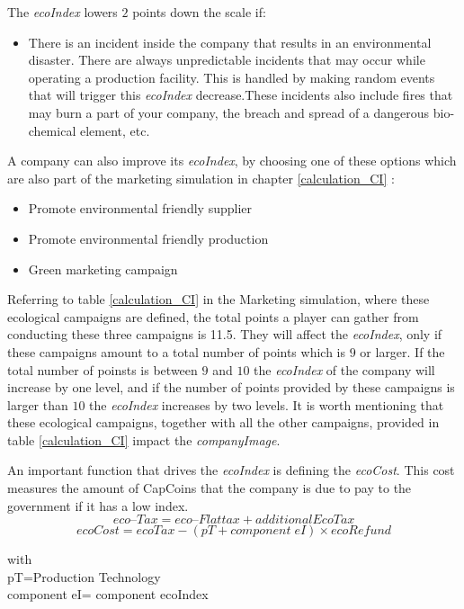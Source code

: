 The \textit{ecoIndex} lowers $2$ points down the scale if: 
\begin{itemize}
	\item There is an incident inside the company that results in an environmental disaster. There are always unpredictable incidents that may occur while operating a production facility. This is handled by making random events that will trigger this \textit{ecoIndex} decrease.These incidents also include fires that may burn a part of your company, the breach and spread of a dangerous bio-chemical element, etc.
\end{itemize}

A company can also improve its \textit{ecoIndex}, by choosing one of these options which are also part of the marketing simulation in chapter \ref{calculation_CI} : 

\begin{itemize}
\item Promote environmental friendly supplier
\item Promote environmental friendly production
\item Green marketing campaign
\end{itemize}
Referring to table \ref{calculation_CI} in the Marketing simulation, where these ecological campaigns are defined, the total points a player can gather from conducting these three campaigns is 11.5. They will affect the \textit{ecoIndex}, only if these campaigns amount to a total number of points which is $9$ or larger. If the total number of poinsts is between $9$ and $10$ the \textit{ecoIndex} of the company will increase by one level, and if the number of points provided by these campaigns is larger than $10$ the \textit{ecoIndex} increases by two levels. It is worth mentioning that these ecological campaigns, together with all the other campaigns, provided in table \ref{calculation_CI} impact the \textit{companyImage}.

An important function that drives the \textit{ecoIndex} is defining the \textit{ecoCost}. This cost measures the amount of CapCoins that the company is due to pay to the government if it has a low index. \\ 
\begin{equation}
eco–Tax= eco–Flat tax+ additionalEcoTax
\label{eq:eco-tax}
\end{equation}
\begin{equation}
ecoCost= ecoTax - (pT + component \; eI)\times ecoRefund 
\label{eq:eco-cost}
\end{equation}
\begin{center}
with\\
	pT=Production Technology\\
	component \gls{eI}= component ecoIndex\\
\end{center}


